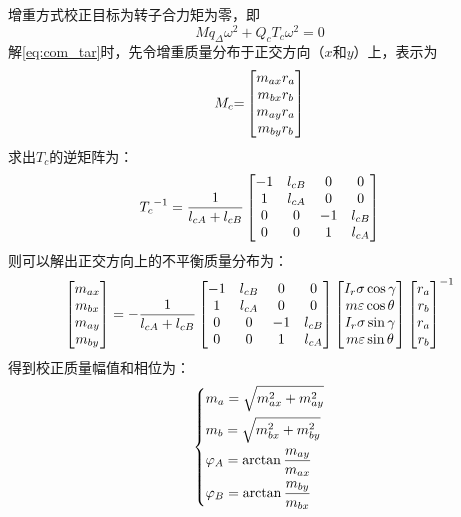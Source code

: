 \documentclass[
  lang=cn,
  degree=master,
  openany,oneside
]{nuaathesis}
\begin{document}
增重方式校正目标为转子合力矩为零，即
\begin{equation}
\label{eq:com_tar}
Mq_{\Delta}{\omega}^2 + Q_cT_c{\omega}^2 = 0
\end{equation}
解\autoref{eq:com_tar}时，先令增重质量分布于正交方向（$x$和$y$）上，表示为
\begin{equation}
{M_c}{\rm{ = }}\left[ {\begin{matrix}
   {{m_{ax}}{r_a}}  \cr 
   {{m_{bx}}{r_b}}  \cr 
   {{m_{ay}}{r_a}}  \cr 
   {{m_{by}}{r_b}}  \cr 

 \end{matrix} } \right]
\end{equation}
求出$T_c$的逆矩阵为：
\begin{equation}
{T_c}^{ - 1} = {1 \over {{l_{cA}} + {l_{cB}}}}\left[ {\begin{matrix}
   { - 1} & {{l_{cB}}} & 0 & 0  \cr 
   1 & {{l_{cA}}} & 0 & 0  \cr 
   0 & 0 & { - 1} & {{l_{cB}}}  \cr 
   0 & 0 & 1 & {{l_{cA}}}  \cr 

 \end{matrix} } \right]
\end{equation}
则可以解出正交方向上的不平衡质量分布为：
\begin{equation}
\left[ {\begin{matrix}
   {{m_{ax}}}  \cr 
   {{m_{bx}}}  \cr 
   {{m_{ay}}}  \cr 
   {{m_{by}}}  \cr 

 \end{matrix} } \right] =  - {1 \over {{l_{cA}} + {l_{cB}}}}\left[ {\begin{matrix}
   { - 1} & {{l_{cB}}} & 0 & 0  \cr 
   1 & {{l_{cA}}} & 0 & 0  \cr 
   0 & 0 & { - 1} & {{l_{cB}}}  \cr 
   0 & 0 & 1 & {{l_{cA}}}  \cr 

 \end{matrix} } \right]\left[ {\begin{matrix}
   {{I_r}\sigma \cos \gamma }  \cr 
   {m\varepsilon \cos \theta }  \cr 
   {{I_r}\sigma \sin \gamma }  \cr 
   {m\varepsilon \sin \theta }  \cr 

 \end{matrix} } \right]{\left[ {\begin{matrix}
   {{r_a}}  \cr 
   {{r_b}}  \cr 
   {{r_a}}  \cr 
   {{r_b}}  \cr 

 \end{matrix} } \right]^{ - 1}}
\end{equation}
得到校正质量幅值和相位为：
\begin{equation}
\left\{
\begin{aligned}
&{m_a} = \sqrt {m_{ax}^2 + m_{ay}^2}\\
&{m_b} = \sqrt {m_{bx}^2 + m_{by}^2} \\  
&{\varphi _A} = \arctan {{{m_{ay}}} \over {{m_{ax}}}} \\
&{\varphi _B} = \arctan {{{m_{by}}} \over {{m_{bx}}}} \\ 
\end{aligned}
\right.
\end{equation}
\end{document}
